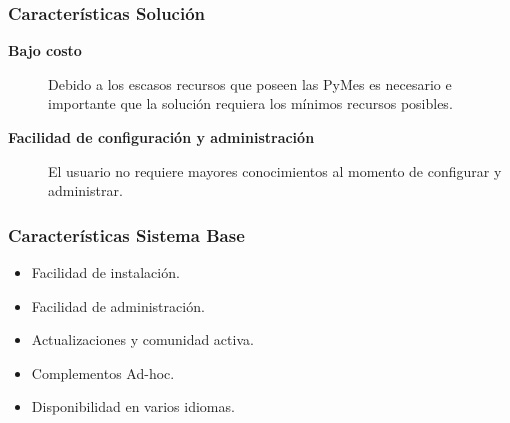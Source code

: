 \documentclass[10pt, compress]{beamer}
\begin{document}
\begin{frame}
 \frametitle{Características Solución}
\begin{description}
 \item[\textbf{Bajo costo}] Debido a los escasos recursos que poseen las PyMes es necesario e importante que
la solución requiera los mínimos recursos posibles.
 \item[\textbf{Facilidad de configuración y administración}] El usuario no requiere mayores conocimientos al momento
de configurar y administrar.
\end{description}
\end{frame}

\begin{frame}
 \frametitle{Características Sistema Base}

\begin{itemize}
 \item Facilidad de instalación.
 \item Facilidad de administración.
 \item Actualizaciones y comunidad activa.
 \item Complementos Ad-hoc.
 \item Disponibilidad en varios idiomas.
\end{itemize}
\end{frame}
\end{document}
